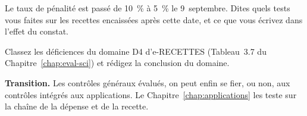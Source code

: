 \begin{boxexo}[title={\ding{45}\quad Exercice~10.3. Les effets d'un changement \niveaumoyen}]
Le taux de pénalité est passé de 10~\% à 5~\% le 9~septembre. Dites quels
tests vous faites sur les recettes encaissées après cette date, et ce que
vous écrivez dans l'effet du constat.
\end{boxexo}

\begin{boxexo}[title={\ding{45}\quad Exercice~10.4. Classer \niveauexpert}]
Classez les déficiences du domaine D4 d'e-RECETTES (Tableau~3.7 du
Chapitre~\ref{chap:eval-sci}) et rédigez la conclusion du domaine.
\end{boxexo}

\begin{boxinfo}
\textbf{Transition.} Les contrôles généraux évalués, on peut enfin se
fier, ou non, aux contrôles intégrés aux applications. Le
Chapitre~\ref{chap:applications} les teste sur la chaîne de la dépense et
de la recette.
\end{boxinfo}
